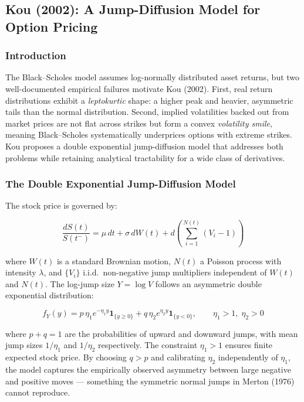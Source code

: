 \documentclass[12pt]{article}
\begin{document}
\subsection*{Kou (2002): A Jump-Diffusion Model for Option Pricing}

\subsubsection*{Introduction}

The Black--Scholes model assumes log-normally distributed asset returns, but two
well-documented empirical failures motivate Kou (2002). First, real return distributions
exhibit a \textit{leptokurtic} shape: a higher peak and heavier, asymmetric tails than
the normal distribution. Second, implied volatilities backed out from market prices are
not flat across strikes but form a convex \textit{volatility smile}, meaning Black--Scholes
systematically underprices options with extreme strikes. Kou proposes a double exponential
jump-diffusion model that addresses both problems while retaining analytical tractability
for a wide class of derivatives.

\subsubsection*{The Double Exponential Jump-Diffusion Model}

The stock price is governed by:

\begin{equation}
    \frac{dS(t)}{S(t^{-})} = \mu\,dt + \sigma\,dW(t)
    + d\!\left(\sum_{i=1}^{N(t)}(V_i - 1)\right)
\end{equation}

where $W(t)$ is a standard Brownian motion, $N(t)$ a Poisson process with intensity
$\lambda$, and $\{V_i\}$ i.i.d.\ non-negative jump multipliers independent of $W(t)$ and
$N(t)$. The log-jump size $Y = \log V$ follows an asymmetric double exponential
distribution:

\begin{equation}
    f_Y(y) = p\,\eta_1 e^{-\eta_1 y}\mathbf{1}_{\{y\geq 0\}}
           + q\,\eta_2 e^{\eta_2 y}\mathbf{1}_{\{y < 0\}},
    \qquad \eta_1>1,\;\eta_2>0
\end{equation}

where $p+q=1$ are the probabilities of upward and downward jumps, with mean jump sizes
$1/\eta_1$ and $1/\eta_2$ respectively. The constraint $\eta_1>1$ ensures finite expected
stock price. By choosing $q>p$ and calibrating $\eta_2$ independently of $\eta_1$, the
model captures the empirically observed asymmetry between large negative and positive
moves --- something the symmetric normal jumps in Merton (1976) cannot reproduce.
\end{document}
